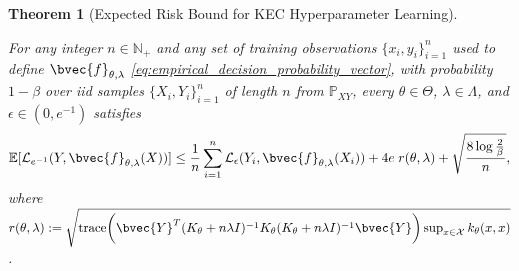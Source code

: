 \documentclass{article}
\newtheorem{theorem}{Theorem}[section]
\begin{document}
	\begin{theorem}[Expected Risk Bound for KEC Hyperparameter Learning]
		\label{thm:expected_risk_bound_hyperparameter_learning_copy}
		
		For any integer $n \in \mathbb{N}_{+}$ and any set of training observations $\{x_{i}, y_{i}\}_{i = 1}^{n}$ used to define $\bvec{f}_{\theta, \lambda}$ \eqref{eq:empirical_decision_probability_vector}, with probability $1 - \beta$ over \textit{iid} samples $\{X_{i}, Y_{i}\}_{i = 1}^{n}$ of length $n$ from $\mathbb{P}_{X Y}$, every $\theta \in \Theta$, $\lambda \in \Lambda$, and $\epsilon \in (0, e^{-1})$ satisfies
		\begin{equation}
			\mathbb{E}[\mathcal{L}_{e^{-1}}(Y, \bvec{f}_{\theta, \lambda}(X))] \leq \frac{1}{n} \sum_{i = 1}^{n} \mathcal{L}_{\epsilon}(Y_{i}, \bvec{f}_{\theta, \lambda}(X_{i})) + 4 e \; r(\theta, \lambda) + \sqrt{\frac{8 \log{\frac{2}{\beta}}}{n}},
		\label{eq:expected_risk_bound_hyperparameter_learning_copy}
		\end{equation}
		where $r(\theta, \lambda) := \sqrt{\mathrm{trace}\bigg(\bvec{Y}^{T} (K_{\theta} + n \lambda I)^{-1} K_{\theta} (K_{\theta} + n \lambda I)^{-1} \bvec{Y}\bigg) \sup_{x \in \mathcal{X}} k_{\theta}(x, x)}$.
	\end{theorem}
	
\end{document}
